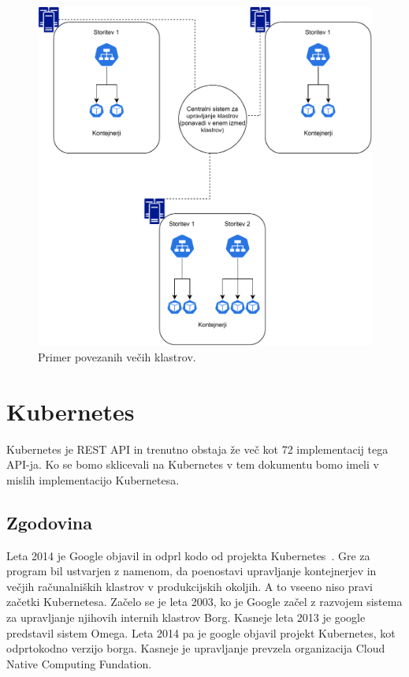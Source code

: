 \documentclass[a4paper, 12pt]{book}
\begin{document}
\begin{figure}[h]
\begin{center}
\includegraphics[width=1.0\textwidth]{images/primer-povezanih-klastrov.pdf}
\end{center}
\caption{Primer povezanih večih klastrov.}
\label{problem-povezanih-klastrov}
\end{figure}

\chapter{Kubernetes}
\label{Kubernetes}
Kubernetes je REST API in trenutno obstaja že več kot 72 implementacij tega API-ja. Ko se bomo sklicevali na Kubernetes v tem dokumentu bomo imeli v mislih implementacijo Kubernetesa.
\section{Zgodovina}
Leta 2014 je Google objavil in odprl kodo od projekta Kubernetes~\cite{what-is-Kubernetes}.
Gre za program bil ustvarjen z namenom, da poenostavi upravljanje kontejnerjev in večjih računalniških klastrov v produkcijskih okoljih.
A to vseeno niso pravi začetki Kubernetesa.
Začelo se je leta 2003, ko je Google začel z razvojem sistema za upravljanje njihovih internih klastrov Borg.
Kasneje leta 2013 je google predstavil sistem Omega.
Leta 2014 pa je google objavil projekt Kubernetes, kot odprtokodno verzijo borga.
Kasneje je upravljanje prevzela organizacija Cloud Native Computing Fundation.
\end{document}
